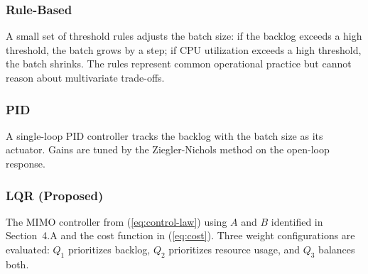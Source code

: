 \subsubsection{Rule-Based}
A small set of threshold rules adjusts the batch size: if the backlog exceeds a high threshold, the batch grows by a step; if CPU utilization exceeds a high threshold, the batch shrinks. The rules represent common operational practice but cannot reason about multivariate trade-offs.

\subsubsection{PID}
A single-loop PID controller tracks the backlog with the batch size as its actuator. Gains are tuned by the Ziegler-Nichols method on the open-loop response.

\subsubsection{LQR (Proposed)}
The MIMO controller from (\ref{eq:control-law}) using $A$ and $B$ identified in Section~4.A and the cost function in (\ref{eq:cost}). Three weight configurations are evaluated: $Q_1$ prioritizes backlog, $Q_2$ prioritizes resource usage, and $Q_3$ balances both.

